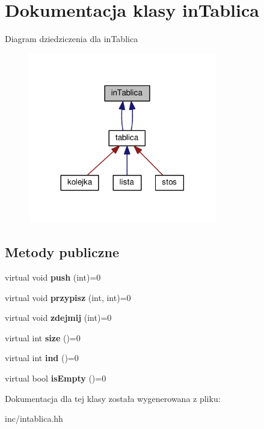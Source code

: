 \section{Dokumentacja klasy in\+Tablica}
\label{classin_tablica}


Diagram dziedziczenia dla in\+Tablica
\nopagebreak
\begin{figure}[H]
\begin{center}
\leavevmode
\includegraphics[width=233pt]{classin_tablica__inherit__graph}
\end{center}
\end{figure}
\subsection*{Metody publiczne}
\begin{DoxyCompactItemize}
\item 
virtual void {\bfseries push} (int)=0\label{classin_tablica_a9ba9ffcda633d7788acbbc877b402d2e}

\item 
virtual void {\bfseries przypisz} (int, int)=0\label{classin_tablica_a0261e4203277dc7bb509a6e16ea11fee}

\item 
virtual void {\bfseries zdejmij} (int)=0\label{classin_tablica_a1e01ff840ff32352abac3c2b4b8de684}

\item 
virtual int {\bfseries size} ()=0\label{classin_tablica_a039fb28e7e83fb730a45050a8b43847f}

\item 
virtual int {\bfseries ind} ()=0\label{classin_tablica_a58a123a9dfc74fcfe7ce824a228c2153}

\item 
virtual bool {\bfseries is\+Empty} ()=0\label{classin_tablica_a29cd0f3dffa632a9a54a64079eae9019}

\end{DoxyCompactItemize}


Dokumentacja dla tej klasy została wygenerowana z pliku\+:\begin{DoxyCompactItemize}
\item 
inc/intablica.\+hh\end{DoxyCompactItemize}
